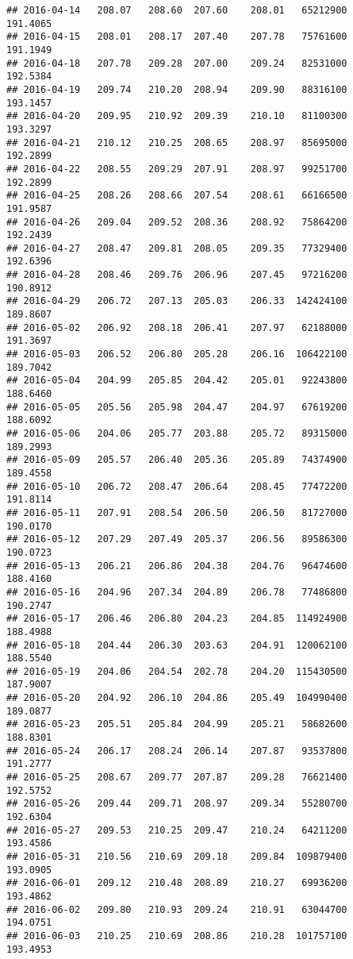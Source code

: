 \documentclass[
]{article}
\begin{document}
\begin{verbatim}
## 2016-04-14   208.07   208.60  207.60    208.01   65212900     191.4065
## 2016-04-15   208.01   208.17  207.40    207.78   75761600     191.1949
## 2016-04-18   207.78   209.28  207.00    209.24   82531000     192.5384
## 2016-04-19   209.74   210.20  208.94    209.90   88316100     193.1457
## 2016-04-20   209.95   210.92  209.39    210.10   81100300     193.3297
## 2016-04-21   210.12   210.25  208.65    208.97   85695000     192.2899
## 2016-04-22   208.55   209.29  207.91    208.97   99251700     192.2899
## 2016-04-25   208.26   208.66  207.54    208.61   66166500     191.9587
## 2016-04-26   209.04   209.52  208.36    208.92   75864200     192.2439
## 2016-04-27   208.47   209.81  208.05    209.35   77329400     192.6396
## 2016-04-28   208.46   209.76  206.96    207.45   97216200     190.8912
## 2016-04-29   206.72   207.13  205.03    206.33  142424100     189.8607
## 2016-05-02   206.92   208.18  206.41    207.97   62188000     191.3697
## 2016-05-03   206.52   206.80  205.28    206.16  106422100     189.7042
## 2016-05-04   204.99   205.85  204.42    205.01   92243800     188.6460
## 2016-05-05   205.56   205.98  204.47    204.97   67619200     188.6092
## 2016-05-06   204.06   205.77  203.88    205.72   89315000     189.2993
## 2016-05-09   205.57   206.40  205.36    205.89   74374900     189.4558
## 2016-05-10   206.72   208.47  206.64    208.45   77472200     191.8114
## 2016-05-11   207.91   208.54  206.50    206.50   81727000     190.0170
## 2016-05-12   207.29   207.49  205.37    206.56   89586300     190.0723
## 2016-05-13   206.21   206.86  204.38    204.76   96474600     188.4160
## 2016-05-16   204.96   207.34  204.89    206.78   77486800     190.2747
## 2016-05-17   206.46   206.80  204.23    204.85  114924900     188.4988
## 2016-05-18   204.44   206.30  203.63    204.91  120062100     188.5540
## 2016-05-19   204.06   204.54  202.78    204.20  115430500     187.9007
## 2016-05-20   204.92   206.10  204.86    205.49  104990400     189.0877
## 2016-05-23   205.51   205.84  204.99    205.21   58682600     188.8301
## 2016-05-24   206.17   208.24  206.14    207.87   93537800     191.2777
## 2016-05-25   208.67   209.77  207.87    209.28   76621400     192.5752
## 2016-05-26   209.44   209.71  208.97    209.34   55280700     192.6304
## 2016-05-27   209.53   210.25  209.47    210.24   64211200     193.4586
## 2016-05-31   210.56   210.69  209.18    209.84  109879400     193.0905
## 2016-06-01   209.12   210.48  208.89    210.27   69936200     193.4862
## 2016-06-02   209.80   210.93  209.24    210.91   63044700     194.0751
## 2016-06-03   210.25   210.69  208.86    210.28  101757100     193.4953

\end{verbatim}
\end{document}
